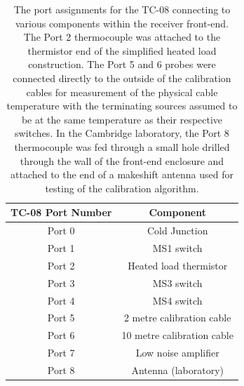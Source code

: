 \begin{table}
    \begin{center}
    \begin{tabular}{ |c|c| }
    \hline
    TC-08 Port Number & Component \\
    \hline
    Port 0 & Cold Junction \\
    Port 1 & MS1 switch \\
    Port 2 & Heated load thermistor \\
    Port 3 & MS3 switch\\
    Port 4 & MS4 switch \\
    Port 5 & 2 metre calibration cable \\
    Port 6 & 10 metre calibration cable \\
    Port 7 & Low noise amplifier \\
    Port 8 & Antenna (laboratory) \\
    \hline
    \end{tabular}
    \caption{The port assignments for the TC-08 connecting to various components within the receiver front-end. The Port 2 thermocouple was attached to the thermistor end of the simplified heated load construction. The Port 5 and 6 probes were connected directly to the outside of the calibration cables for measurement of the physical cable temperature with the terminating sources assumed to be at the same temperature as their respective switches. In the Cambridge laboratory, the Port 8 thermocouple was fed through a small hole drilled through the wall of the front-end enclosure and attached to the end of a makeshift antenna used for testing of the calibration algorithm.}
    \label{tab:tc08}
    \end{center}
\end{table}

